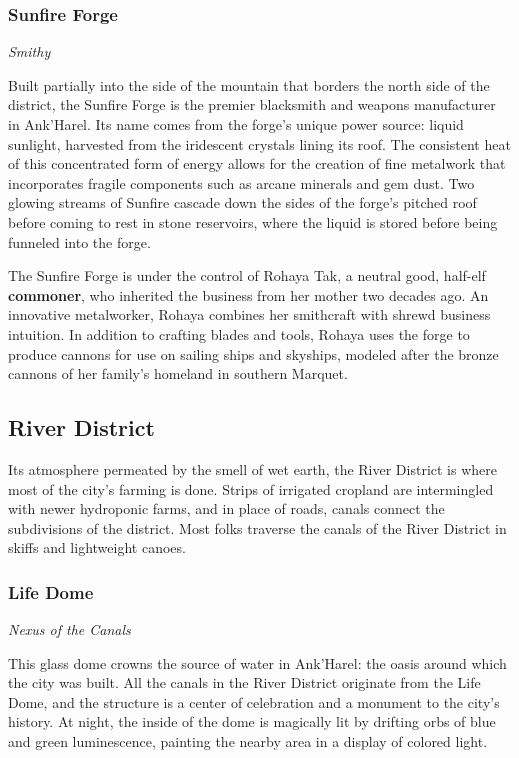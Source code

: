 \documentclass[a4paper, 11pt, bg=full, twocolumn, nooutline]{dndbook}
\begin{document}
\subsubsection{Sunfire Forge}

\textit{Smithy}

Built partially into the side of the mountain that borders the north side of the district, the Sunfire Forge is the premier blacksmith and weapons manufacturer in Ank'Harel. Its name comes from the forge's unique power source: liquid sunlight, harvested from the iridescent crystals lining its roof. The consistent heat of this concentrated form of energy allows for the creation of fine metalwork that incorporates fragile components such as arcane minerals and gem dust. Two glowing streams of Sunfire cascade down the sides of the forge's pitched roof before coming to rest in stone reservoirs, where the liquid is stored before being funneled into the forge.

The Sunfire Forge is under the control of Rohaya Tak, a neutral good, half-elf \textbf{commoner}, who inherited the business from her mother two decades ago. An innovative metalworker, Rohaya combines her smithcraft with shrewd business intuition. In addition to crafting blades and tools, Rohaya uses the forge to produce cannons for use on sailing ships and skyships, modeled after the bronze cannons of her family's homeland in southern Marquet.

\subsection{River District}

Its atmosphere permeated by the smell of wet earth, the River District is where most of the city's farming is done. Strips of irrigated cropland are intermingled with newer hydroponic farms, and in place of roads, canals connect the subdivisions of the district. Most folks traverse the canals of the River District in skiffs and lightweight canoes.

\subsubsection{Life Dome}

\textit{Nexus of the Canals}

This glass dome crowns the source of water in Ank'Harel: the oasis around which the city was built. All the canals in the River District originate from the Life Dome, and the structure is a center of celebration and a monument to the city's history. At night, the inside of the dome is magically lit by drifting orbs of blue and green luminescence, painting the nearby area in a display of colored light.
\end{document}
